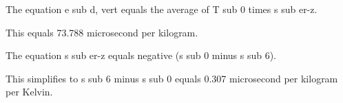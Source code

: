The equation e sub d, vert equals the average of T sub 0 times s sub er-z.

This equals 73.788 microsecond per kilogram.

The equation s sub er-z equals negative (s sub 0 minus s sub 6).

This simplifies to s sub 6 minus s sub 0 equals 0.307 microsecond per kilogram per Kelvin.
